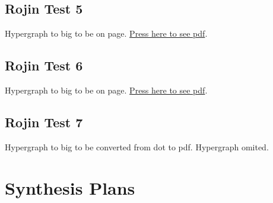 \documentclass[a4paper,10pt,titlepage]{paper}
\begin{document}
\subsection{Rojin Test 5}
\begin{flushleft}
Hypergraph to big to be on page. \href{RojinGrafer/test5.pdf}{Press here to see pdf}.
\end{flushleft}
\label{Appendix::Rojin5}

\subsection{Rojin Test 6}
\begin{flushleft}
Hypergraph to big to be on page. \href{RojinGrafer/test6.pdf}{Press here to see pdf}.
\end{flushleft}
\label{Appendix::Rojin6}

\subsection{Rojin Test 7 }
\begin{flushleft}
Hypergraph to big to be converted from dot to pdf. Hypergraph omited.
\end{flushleft}
\label{Appendix::Rojin7}

\section{Synthesis Plans}
\end{document}

